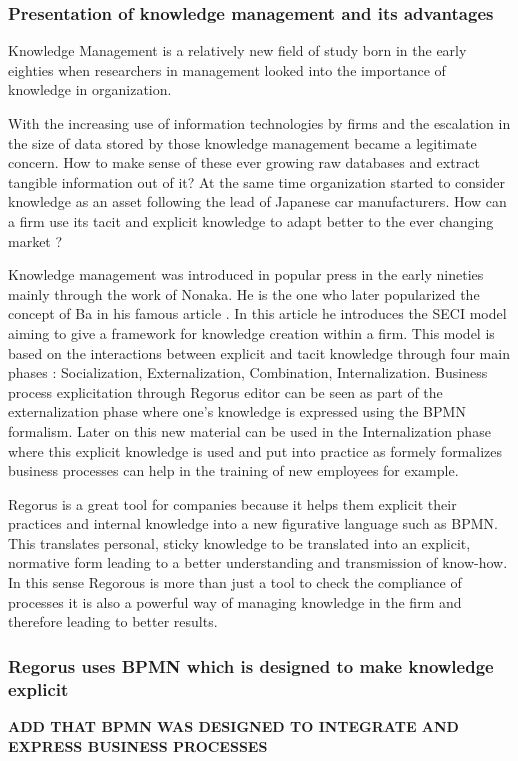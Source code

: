 \documentclass[10pt]{report}
\begin{document}
\subsubsection{Presentation of knowledge management and its advantages}

Knowledge Management is a relatively new field of study born in the early eighties when researchers in management looked into the importance of knowledge in organization.\autocite{Wiig19971}

With the increasing use of information technologies by firms and the escalation in the size of data stored by those knowledge management became a legitimate concern. How to make sense of these ever growing raw databases and extract tangible information out of it? At the same time organization started to consider knowledge as an asset following the lead of Japanese car manufacturers.\autocite{Koenig08} How can a firm use its tacit and explicit knowledge to adapt better to the ever changing market ?

Knowledge management was introduced in popular press in the early nineties mainly through the work of Nonaka. \autocite{nonaka1991knowledge} He is the one who later popularized the concept of Ba in his famous article \autocite{Nonaka_Konno_1998}. In this article he introduces the SECI model aiming to give a framework for knowledge creation within a firm. This model is based on the interactions between explicit and tacit knowledge through four main phases : Socialization, Externalization, Combination, Internalization. Business process explicitation through Regorus editor can be seen as part of the externalization phase where one's knowledge is expressed using the BPMN formalism. Later on this new material can be used in the Internalization phase where this explicit knowledge is used and put into practice as formely formalizes business processes can help in the training of new employees for example.

Regorus is a great tool for companies because it helps them explicit their practices and internal knowledge into a new figurative language such as BPMN. This translates personal, sticky knowledge to be translated into an explicit, normative form leading to a better understanding and transmission of know-how. In this sense Regorous is more than just a tool to check the compliance of processes it is also a powerful way of managing knowledge in the firm and therefore leading to better results.

\subsubsection{Regorus uses BPMN which is designed to make knowledge explicit}
\textbf{ADD THAT BPMN WAS DESIGNED TO INTEGRATE AND EXPRESS BUSINESS PROCESSES}
\end{document}
